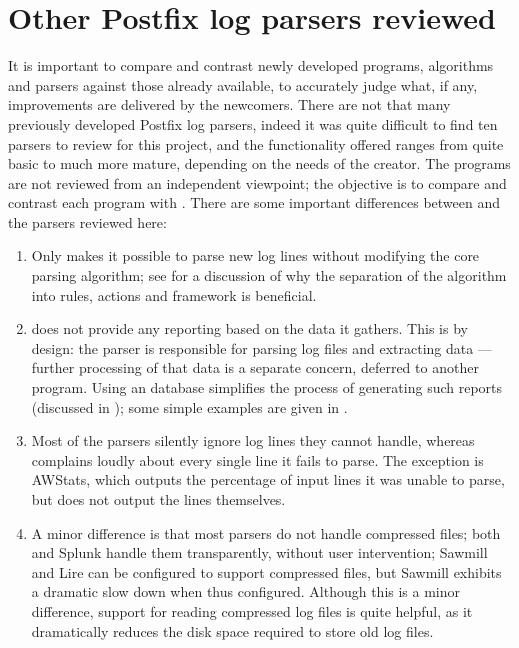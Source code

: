 \section{Other Postfix log parsers reviewed}

\label{other-parsers}

It is important to compare and contrast newly developed programs,
algorithms and parsers against those already available, to accurately judge
what, if any, improvements are delivered by the newcomers.  There are not
that many previously developed Postfix log parsers, indeed it was quite
difficult to find ten parsers to review for this project, and the
functionality offered ranges from quite basic to much more mature,
depending on the needs of the creator.  The programs are not reviewed from
an independent viewpoint; the objective is to compare and contrast each
program with \parsername{}.  There are some important differences between
\parsername{} and the parsers reviewed here:

\begin{enumerate}

    \item Only \parsername{} makes it possible to parse new log lines
        without modifying the core parsing algorithm; see  for a discussion of why the
        separation of the algorithm into rules, actions and framework is
        beneficial.

    \item \parsername{} does not provide any reporting based on the data it
        gathers.  This is by design: the parser is responsible for parsing
        log files and extracting data --- further processing of that data
        is a separate concern, deferred to another program.  Using an
        \SQL{} database simplifies the process of generating such reports
        (discussed in ); some simple examples
        are given in .

    \item Most of the parsers silently ignore log lines they cannot handle,
        whereas \parsername{} complains loudly about every single line it
        fails to parse.  The exception is AWStats, which outputs the
        percentage of input lines it was unable to parse, but does not
        output the lines themselves.

    \item A minor difference is that most parsers do not handle compressed
        files; both \parsername{} and Splunk handle them transparently,
        without user intervention; Sawmill and Lire can be configured to
        support compressed files, but Sawmill exhibits a dramatic slow down
        when thus configured.  Although this is a minor difference, support
        for reading compressed log files is quite helpful, as it
        dramatically reduces the disk space required to store old log
        files.

\end{enumerate}

